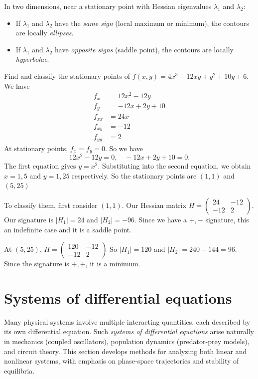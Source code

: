 \documentclass[a4paper]{article}
\begin{document}
\begin{prop}
  In two dimensions, near a stationary point with Hessian eigenvalues $\lambda_1$ and $\lambda_2$:
  \begin{itemize}
    \item If $\lambda_1$ and $\lambda_2$ have the \emph{same sign} (local maximum or minimum), the contours are locally \emph{ellipses}.
    \item If $\lambda_1$ and $\lambda_2$ have \emph{opposite signs} (saddle point), the contours are locally \emph{hyperbolae}.
  \end{itemize}
\end{prop}

\begin{eg}
  Find and classify the stationary points of $f(x, y) = 4x^3 - 12xy + y^2 + 10y + 6$. We have
  \begin{align*}
    f_x &= 12x^2 - 12y\\
    f_y &= -12x + 2y + 10\\
    f_{xx} &= 24x\\
    f_{xy} &= -12\\
    f_{yy} &= 2
  \end{align*}
  At stationary points, $f_x = f_y = 0$. So we have
  \[
    12x^2 - 12y = 0,\quad -12x + 2y + 10 = 0.
  \]
  The first equation gives $y = x^2$. Substituting into the second equation, we obtain $x = 1, 5$ and $y = 1, 25$ respectively. So the stationary points are $(1, 1)$ and $(5, 25)$

  To classify them, first consider $(1, 1)$. Our Hessian matrix $H =
  \begin{pmatrix}
    24 & -12\\
    -12 & 2
  \end{pmatrix}$. Our signature is $|H_1| = 24$ and $|H_2| = -96$. Since we have a $+, -$ signature, this an indefinite case and it is a saddle point.

  At $(5, 25)$, $H =
  \begin{pmatrix}
    120 & -12\\
    -12 & 2
  \end{pmatrix}$
  So $|H_1| = 120$ and $|H_2| = 240 - 144 = 96$. Since the signature is $+, +$, it is a minimum.

\end{eg}

\section{Systems of differential equations}
\begin{remark}[Overview]
  Many physical systems involve multiple interacting quantities, each described by its own differential equation. Such \emph{systems of differential equations} arise naturally in mechanics (coupled oscillators), population dynamics (predator-prey models), and circuit theory. This section develops methods for analyzing both linear and nonlinear systems, with emphasis on phase-space trajectories and stability of equilibria.
\end{remark}
\end{document}
